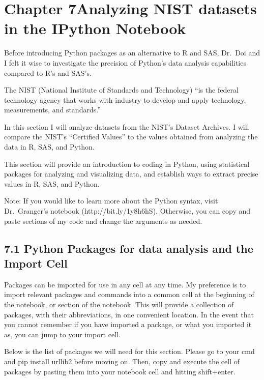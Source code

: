 \documentclass{article}
\begin{document}
    \section{Chapter 7Analyzing NIST datasets in the IPython Notebook}


    Before introducing Python packages as an alternative to R and SAS,
Dr.~Doi and I felt it wise to investigate the precision of Python's data
analysis capabilities compared to R's and SAS's.

The NIST (National Institute of Standards and Technology) ``is the
federal technology agency that works with industry to develop and apply
technology, measurements, and standards.''

In this section I will analyze datasets from the NIST's Dataset
Archives. I will compare the NIST's ``Certified Values'' to the values
obtained from analyzing the data in R, SAS, and Python.

This section will provide an introduction to coding in Python, using
statistical packages for analyzing and visualizing data, and establish
ways to extract precise values in R, SAS, and Python.

Note: If you would like to learn more about the Python syntax, visit
Dr.~Granger's notebook (http://bit.ly/1y8h6hS). Otherwise, you can copy
and paste sections of my code and change the arguments as needed.


    \subsection{7.1 Python Packages for data analysis and the Import Cell}


    Packages can be imported for use in any cell at any time. My preference
is to import relevant packages and commands into a common cell at the
beginning of the notebook, or section of the notebook. This will provide
a collection of packages, with their abbreviations, in one convenient
location. In the event that you cannot remember if you have imported a
package, or what you imported it as, you can jump to your import cell.

    Below is the list of packages we will need for this section. Please go
to your cmd and pip install urllib2 before moving on. Then, copy and
execute the cell of packages by pasting them into your notebook cell and
hitting shift+enter.
\end{document}
